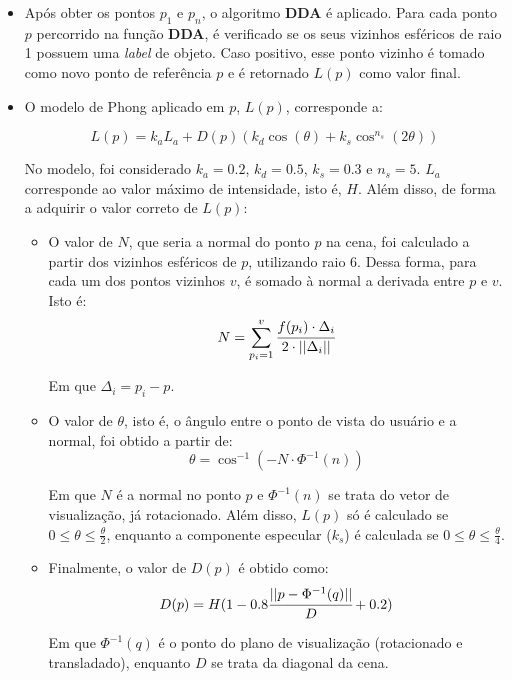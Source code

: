             \begin{itemize}
                \item Após obter os pontos $p_1$ e $p_n$, o algoritmo \textbf{DDA} é aplicado. Para cada ponto $p$ percorrido na função \textbf{DDA}, é verificado se os seus vizinhos esféricos de raio 1 possuem uma \textit{label} de objeto. Caso positivo, esse ponto vizinho é tomado como novo ponto de referência $p$ e é retornado $L(p)$ como valor final.
                \item O modelo de Phong aplicado em $p$, $L(p)$, corresponde a:

                \begin{equation}
                    L(p) = k_aL_a + D(p)(k_d\cos(\theta) + k_s\cos^{n_s}(2\theta))
                \end{equation}

                No modelo, foi considerado $k_a = 0.2$, $k_d = 0.5$, $k_s = 0.3$ e $n_s = 5$. $L_a$ corresponde ao valor máximo de intensidade, isto é, $H$. Além disso, de forma a adquirir o valor correto de $L(p)$:
                \begin{itemize}
                    \item O valor de $N$, que seria a normal do ponto $p$ na cena, foi calculado a partir dos vizinhos esféricos de $p$, utilizando raio 6. Dessa forma, para cada um dos pontos vizinhos $v$, é somado à normal a derivada entre $p$ e $v$. Isto é:
                    \begin{equation}
                        N = \sum_{p_i = 1}^{v} \cfrac{f(p_i) \cdot \Delta_i}{2 \cdot ||\Delta_i||}
                    \end{equation}

                    Em que $\Delta_i = p_i - p$.

                    \item O valor de $\theta$, isto é, o ângulo entre o ponto de vista do usuário e a normal, foi obtido a partir de:
                    \begin{equation}
                        \theta = \cos^{-1}(-N \cdot \Phi^{-1}(n))
                    \end{equation}

                    Em que $N$ é a normal no ponto $p$ e $\Phi^{-1}(n)$ se trata do vetor de visualização, já rotacionado. Além disso, $L(p)$ só é calculado se $0 \leq \theta \leq \frac{\theta}{2}$, enquanto a componente especular ($k_s$) é calculada se $0 \leq \theta \leq \frac{\theta}{4}$.

                    \item Finalmente, o valor de $D(p)$ é obtido como:
                    \begin{equation}
                        D(p) = H (1 - 0.8 \cfrac{||p - \Phi^{-1}(q)||}{D} + 0.2)
                    \end{equation}

                    Em que $\Phi^{-1}(q)$ é o ponto do plano de visualização (rotacionado e transladado), enquanto $D$ se trata da diagonal da cena.

                \end{itemize}
            \end{itemize}

